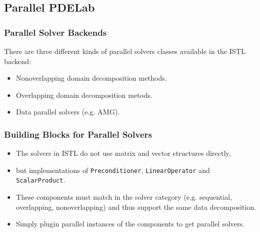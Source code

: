 \subsection{Parallel PDELab}
\label{sec:parallelization}


\begin{frame}
  \frametitle<presentation>{Parallel Solver Backends}
  
  There are three different kinds of parallel solvers classes
  available in the ISTL backend:
  \begin{itemize}
  \item Nonoverlapping domain decomposition
    methods.
  \item Overlapping domain decomposition metods.
  \item Data parallel solvers (e.g. AMG).
  \end{itemize}
\end{frame}

\begin{frame}
  \frametitle{Building Blocks for Parallel Solvers}

  \begin{itemize}
  \item The solvers in ISTL do not use matrix and vector structures
    directly,
  \item but implementations of \lstinline!Preconditioner!,
    \lstinline!LinearOperator! and \lstinline!ScalarProduct!.
  \item These components must match in the solver category
    (e.g. sequential, overlapping, nonoverlapping) and thus support
    the same data decomposition.
  \item Simply plugin parallel instances of the components to get
    parallel solvers.
  \end{itemize}
\end{frame}

